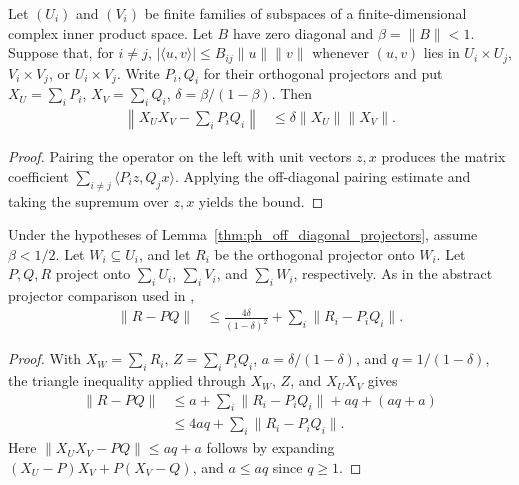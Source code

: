 \begin{lemma}
    \label{thm:ph_off_diagonal_projectors}
    \leanok
    Let $(U_i)$ and $(V_i)$ be finite families of subspaces of a
    finite-dimensional complex inner product space. Let $B$ have zero
    diagonal and $\beta=\lVert B\rVert<1$. Suppose that, for $i\ne j$,
    $|\langle u,v\rangle|\leq B_{ij}\lVert u\rVert\lVert v\rVert$
    whenever $(u,v)$ lies in $U_i\times U_j$, $V_i\times V_j$, or
    $U_i\times V_j$.
    Write $P_i,Q_i$ for their orthogonal projectors and put
    $X_U=\sum_i P_i$, $X_V=\sum_i Q_i$, $\delta=\beta/(1-\beta)$.
    Then
    \begin{align}
        \left\lVert X_U X_V-\sum_i P_iQ_i\right\rVert
         & \leq\delta\lVert X_U\rVert\lVert X_V\rVert.
    \end{align}
\end{lemma}
\begin{proof}
    \leanok
    Pairing the operator on the left with unit vectors $z,x$ produces the
    matrix coefficient $\sum_{i\ne j}\langle P_i z,Q_j x\rangle$.
    Applying the off-diagonal pairing estimate and taking the supremum over
    $z,x$ yields the bound.
\end{proof}

\begin{lemma}
    \label{thm:ph_joint_projector_comparison}
    \leanok
    Under the hypotheses of Lemma~\ref{thm:ph_off_diagonal_projectors},
    assume $\beta<1/2$. Let $W_i\subseteq U_i$, and let $R_i$ be the
    orthogonal projector onto $W_i$.
    Let $P,Q,R$ project onto $\sum_i U_i$, $\sum_i V_i$, and $\sum_i W_i$,
    respectively. As in the abstract projector comparison used in
    \cite[Lemma~6.1(ii)]{Nachtergaele1996Spectral},
    \begin{align}
        \lVert R-PQ\rVert & \leq\frac{4\delta}{(1-\delta)^2}
        +\sum_i\lVert R_i-P_iQ_i\rVert.
    \end{align}
\end{lemma}
\begin{proof}
    \leanok
    With $X_W=\sum_i R_i$, $Z=\sum_i P_iQ_i$,
    $a=\delta/(1-\delta)$, and $q=1/(1-\delta)$,
    the triangle inequality applied through $X_W$, $Z$, and $X_U X_V$ gives
    \begin{align}
        \lVert R-PQ\rVert
         & \leq a+\sum_i\lVert R_i-P_iQ_i\rVert+aq+(aq+a) \\
         & \leq4aq+\sum_i\lVert R_i-P_iQ_i\rVert.
    \end{align}
    Here $\lVert X_U X_V-PQ\rVert\leq aq+a$ follows by expanding
    $(X_U-P)X_V+P(X_V-Q)$, and $a\leq aq$ since $q\geq1$.
\end{proof}

